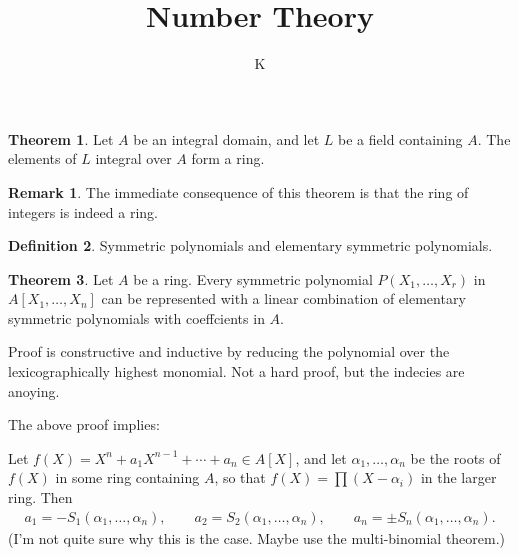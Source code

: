 \documentclass[a4paper]{book}
\title{Number Theory}
\author{K}
\theoremstyle{definition}
\newtheorem{definition}{Definition}[]
\newtheorem{theorem}[definition]{Theorem}
\newtheorem*{remark}{Remark}
\begin{document}
\begin{thmbox}
    \begin{theorem}
        Let \(A\) be an integral domain, and let \(L\) be a field containing \(A\). The elements of \(L\) integral over \(A\) form a ring.
    \end{theorem}
\end{thmbox}
\begin{remark}
    The immediate consequence of this theorem is that the ring of integers is indeed a ring.
\end{remark}
\begin{defbox}
    \begin{definition}
        Symmetric polynomials and elementary symmetric polynomials.
    \end{definition}
\end{defbox}
\begin{thmbox}
    \begin{theorem}
        Let \(A\) be a ring. Every symmetric polynomial \(P(X_1, \ldots, X_r)\) in \(A[X_1, \ldots, X_n]\) can be represented with a linear combination of elementary symmetric polynomials with coeffcients in \(A\).
    \end{theorem}
\end{thmbox}
Proof is constructive and inductive by reducing the polynomial over the lexicographically highest monomial. Not a hard proof, but the indecies are anoying.

The above proof implies:

Let \(f(X) = X^n + a_1 X^{n-1} + \cdots + a_n \in A[X]\), and let \(\alpha_1, \ldots, \alpha_n\) be the roots of \(f(X)\) in some ring containing \(A\), so that \(f(X) = \prod (X - \alpha_i)\) in the larger ring. Then
\begin{align*}
    a_1 = -S_1(\alpha_1, \ldots, \alpha_n), \qquad a_2 = S_2(\alpha_1, \ldots, \alpha_n), \qquad a_n = \pm S_n(\alpha_1, \ldots, \alpha_n) \text{.}
\end{align*}
(I'm not quite sure why this is the case. Maybe use the multi-binomial theorem.)
\end{document}
